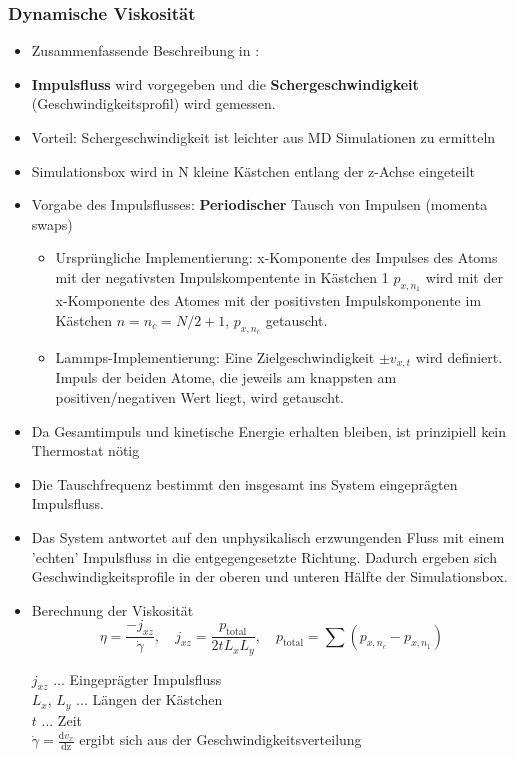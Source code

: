 \documentclass[a4paper, 10pt, 
               numbers=noenddot, toc=graduated,
               headsepline=true, footsepline=true,
               twoside=false, titlepage=true, 
               bibliography=totoc]{scrartcl}
\begin{document}
\subsubsection{Dynamische Viskosität}
	\begin{itemize}
		 \item Zusammenfassende Beschreibung in \cite{Tenney2010}:
		  \item \textbf{Impulsfluss} wird vorgegeben und die \textbf{Schergeschwindigkeit} (Geschwindigkeitsprofil) wird gemessen.
		  \item Vorteil: Schergeschwindigkeit ist leichter aus MD Simulationen zu ermitteln
		  \item Simulationsbox wird in N kleine Kästchen entlang der z-Achse eingeteilt
		  \item Vorgabe des Impulsflusses: \textbf{Periodischer} Tausch von Impulsen (momenta swaps) 
		  		\begin{itemize}
			  		\item Ursprüngliche Implementierung: x-Komponente des Impulses des Atoms mit der negativsten Impulskompentente in Kästchen 1 $p_{x,n_1}$ wird mit der x-Komponente des Atomes mit der positivsten Impulskomponente im Kästchen $n = n_c = N/2 + 1$, $p_{x,n_c}$ getauscht.
			  		\item Lammps-Implementierung: Eine Zielgeschwindigkeit $\pm v_{x,t}$ wird definiert. Impuls der beiden Atome, die jeweils am knappsten am positiven/negativen Wert liegt, wird getauscht.
		  		\end{itemize}
		  \item Da Gesamtimpuls und kinetische Energie erhalten bleiben, ist prinzipiell kein Thermostat nötig
		  \item Die Tauschfrequenz bestimmt den insgesamt ins System eingeprägten Impulsfluss.
		  \item Das System antwortet auf den unphysikalisch erzwungenden Fluss mit einem 'echten' Impulsfluss in die entgegengesetzte Richtung. Dadurch ergeben sich Geschwindigkeitsprofile in der oberen und unteren Hälfte der Simulationsbox.
		  
  		  \item Berechnung der Viskosität
  		  		 \begin{equation}
  		   		 	\eta = \frac{-j_{xz} }{\dot{\gamma} },\quad j_{xz} = \frac{p_{\mathrm{total}}}{2 t L_x L_y},\quad p_{\mathrm{total} }= \sum (p_{x,n_c} - p_{x,n_1})
  		   		\end{equation}
  		   
  		   $j_{xz}$ ... Eingeprägter Impulsfluss\\
  		   $L_x,\,L_y$ ... Längen der Kästchen\\
  		   $t$ ... Zeit\\
  		   $\dot{\gamma} = \frac{\mathrm{d}v_x}{\mathrm{dz}}$ ergibt sich aus der Geschwindigkeitsverteilung
		  

\end{itemize}
\end{document}
